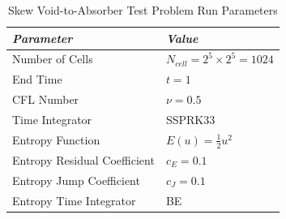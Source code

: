 \begin{table}[h]\caption{Skew Void-to-Absorber Test Problem Run Parameters}
\label{tab:skew_void_to_absorber_run_parameters}
\centering
\begin{tabular}{l l}\toprule
\emph{Parameter} & \emph{Value}\\\midrule
Number of Cells & $N_{cell} = 2^5 \times 2^5 = 1024$\\
End Time & $t = 1$\\
CFL Number & $\nu = 0.5$\\
Time Integrator & SSPRK33\\\midrule
Entropy Function & $E(u) = \frac{1}{2}u^2$\\
Entropy Residual Coefficient & $c_E = 0.1$\\
Entropy Jump Coefficient & $c_J = 0.1$\\
Entropy Time Integrator & BE\\
\bottomrule\end{tabular}
\end{table}
